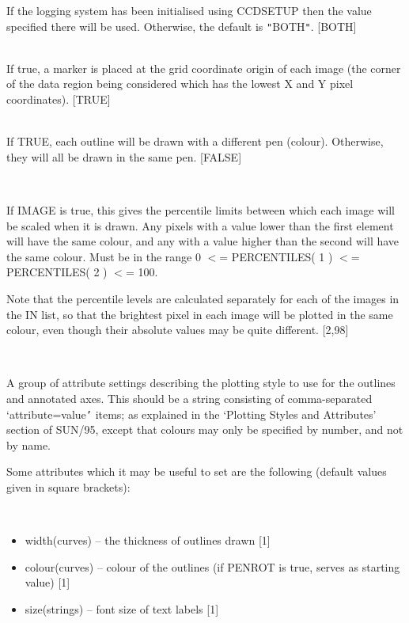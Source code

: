 \documentclass[twoside,11pt]{article}
\newcommand{\xref}[3]{#1}
\renewcommand{\_}{\texttt{\symbol{95}}}
\newcommand{\sstsubsection}[1]{ \item[{#1}] \mbox{} \\}
\newcommand{\sstitemlist}[1]{
  \mbox{} \\
  \vspace{-3.5ex}
  \begin{itemize}
     #1
  \end{itemize}
}
\newcommand{\sstitem}{\item}
\newcommand{\sstsubsection}[1]{\item[{#1}]}
\newcommand{\sstitemlist}[1]{
      \begin{itemize}
         #1
      \end{itemize}
      \\
   }
\newcommand{\sstitem}{\item}
\begin{document}
{{{{         }
         If the logging system has been initialised using CCDSETUP
         then the value specified there will be used. Otherwise, the
         default is {\tt "}BOTH{\tt "}.
         [BOTH]
      }
      \sstsubsection{
         ORIGIN = \_LOGICAL (Read)
      }{
         If true, a marker is placed at the grid coordinate origin
         of each image (the corner of the data region being considered
         which has the lowest X and Y pixel coordinates).
         [TRUE]
      }
      \sstsubsection{
         PENROT = \_LOGICAL (Read)
      }{
         If TRUE, each outline will be drawn with a different pen
         (colour).  Otherwise, they will all be drawn in the same pen.
         [FALSE]
      }
      \sstsubsection{
         PERCENTILES( 2 ) = \_DOUBLE (Read)
      }{
         If IMAGE is true, this gives the percentile limits between
         which each image will be scaled when it is drawn.
         Any pixels with a value lower than the first element
         will have the same colour, and any with a value
         higher than the second will have the same colour.
         Must be in the range 0 $<$= PERCENTILES( 1 ) $<$=
         PERCENTILES( 2 ) $<$= 100.

         Note that the percentile levels are calculated separately for
         each of the images in the IN list, so that the brightest
         pixel in each image will be plotted in the same colour, even
         though their absolute values may be quite different.
         [2,98]
      }
      \sstsubsection{
         STYLE = LITERAL (Read)
      }{
         A group of attribute settings describing the plotting style
         to use for the outlines and annotated axes.  This should be
         a string consisting of comma-separated `attribute=value{\tt '}
         items; as explained in the `\xref{Plotting Styles and Attributes}{sun95}{se_style}'
         section of SUN/95, except that colours may only be specified
         by number, and not by name.

         Some attributes which it may be useful to set are the following
         (default values given in square brackets):
         \sstitemlist{

            \sstitem
               width(curves)   -- the thickness of outlines drawn [1]

            \sstitem
               colour(curves)  -- colour of the outlines (if PENROT is
                                    true, serves as starting value) [1]

            \sstitem
               size(strings)   -- font size of text labels [1]

}}}}
\end{document}
